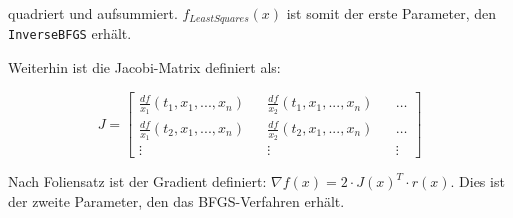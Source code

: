 \documentclass[a4paper, 12pt]{report}
\begin{document}
quadriert und aufsummiert. $f_{LeastSquares}(x)$ ist somit der erste Parameter, den\\
\lstinline[basicstyle=\ttfamily\color{black}]|InverseBFGS| erhält.\par
Weiterhin ist die Jacobi-Matrix definiert als:

$$J = \begin{bmatrix}\frac{df}{x_1}(t_1, x_1, ..., x_n) && \frac{df}{x_2}(t_1, x_1, ..., x_n) && \ldots\\
            \frac{df}{x_1}(t_2, x_1, ..., x_n) && \frac{df}{x_2}(t_2, x_1, ..., x_n) && \ldots\\
            \vdots && \vdots && \vdots\end{bmatrix}$$

Nach Foliensatz ist der Gradient definiert: $\nabla f(x) = 2\cdot J(x)^T\cdot r(x)$. Dies ist der zweite Parameter, den das
BFGS-Verfahren erhält.
\end{document}
